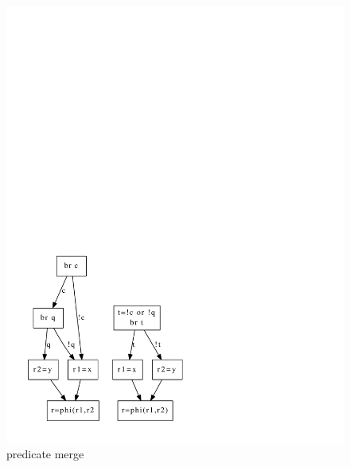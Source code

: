\begin{figure}
\begin{minipage}[t]{5cm}
\includegraphics[scale=0.4]{phi_merge.pdf}
\caption{predicate merge}
\end{minipage}
\begin{minipage}[t]{5cm}

\end{minipage}
\end{figure}
